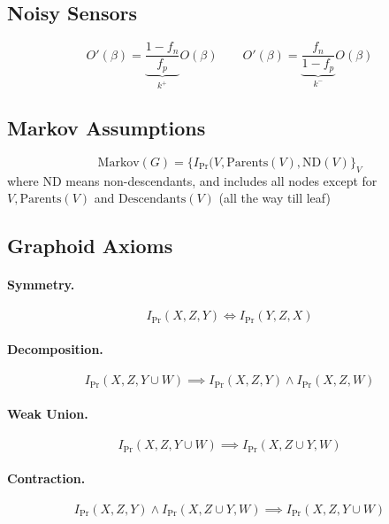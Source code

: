 \documentclass[11pt]{article}
\newcommand{\pr}{\mathrm{Pr}}
\begin{document}
\subsection{Noisy Sensors}
\begin{equation}
	O'(\beta) = \underbrace{\frac{1 - f_n}{f_p}}_{k^+} O(\beta) \quad \quad O'(\beta) = \underbrace{\frac{f_n }{1 - f_p}}_{k^-} O(\beta)
\end{equation}

\subsection{Markov Assumptions}
\begin{equation}
	\mathrm{Markov}(G) = \{I_\pr ( V, \mathrm {Parents} (V), \mathrm{ND} (V) \}_V
\end{equation}
where $\mathrm{ND}$ means non-descendants, and includes all nodes except for $V, \mathrm {Parents} (V)$ and $\mathrm {Descendants}(V)$ (all the way till leaf)

\subsection{Graphoid Axioms\label{sec:graphoid}}
\paragraph{Symmetry.}
\begin{equation}
	I_\pr (X, Z, Y) \iff I _\pr (Y, Z, X) 
\end{equation}

\paragraph{Decomposition.}
\begin{equation}
	I_\pr (X, Z, Y \cup W) \implies I _\pr (X, Z, Y) \land I _\pr (X, Z, W)
\end{equation}

\paragraph{Weak Union.}
\begin{equation}
	I_\pr (X, Z, Y \cup W) \implies I_\pr (X, Z \cup Y, W) 
\end{equation}

\paragraph{Contraction.}
\begin{equation}
	I_\pr (X, Z, Y) \land I_\pr (X, Z \cup Y, W ) \implies I_\pr (X, Z, Y \cup W )
\end{equation}
\end{document}
